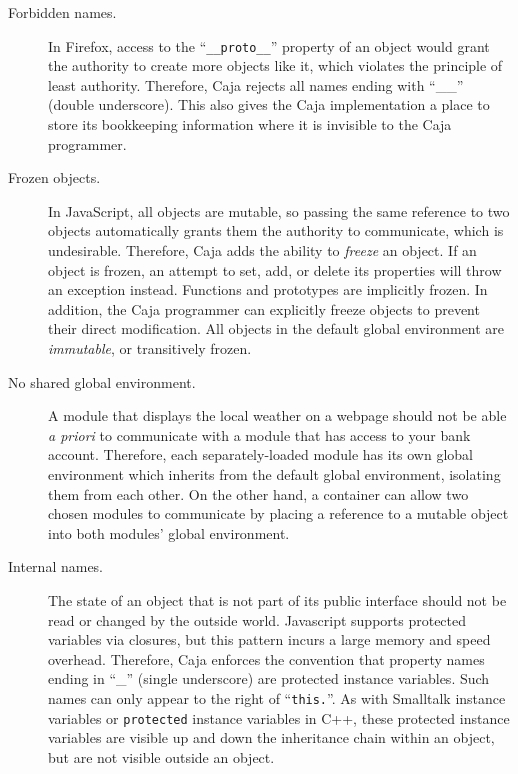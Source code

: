 \documentclass[letterpaper,twocolumn,10pt]{article}
\newcommand{\code}[1]{{\tt {#1}}}              %
\begin{document}
\begin{description}

  \item[Forbidden names.] In Firefox, access to the ``\code{\_\_proto\_\_}'' 
  property of an object would grant the authority to create more objects
  like it, which violates the principle of least authority.  Therefore, 
  Caja rejects all names ending with ``\_\_'' (double 
  underscore). This also gives the Caja implementation a place to store its 
  bookkeeping information where it is invisible to the Caja programmer.
 
  \item[Frozen objects.] In JavaScript, all objects are mutable, so passing
  the same reference to two objects automatically grants them the authority
  to communicate, which is undesirable.  
  Therefore, Caja adds the ability to \emph{freeze} an 
  object. If an object is frozen, an attempt to set, add, or 
  delete its properties will throw an exception instead. Functions and 
  prototypes are implicitly frozen. In addition, the Caja programmer can 
  explicitly freeze objects to prevent their direct modification. All objects 
  in the default global environment are \emph{immutable}, or transitively 
  frozen.
  
  \item[No shared global environment.] A module that displays the local 
  weather on a webpage should not be able \emph{a priori} to communicate 
  with a module that has access to your bank account. Therefore, each 
  separately-loaded module has its own global environment which inherits 
  from the default global environment, isolating them from each other.
  On the other hand, a container can allow two chosen modules to communicate
  by placing a reference to a mutable object into both modules' global
  environment.  

  \item[Internal names.] The state of an object that is not part of its 
  public interface should not be read or changed by the outside world.  
  Javascript supports protected variables via closures, but this pattern 
  incurs a large memory and speed overhead.  Therefore, Caja enforces the
  convention that property names ending in ``\_'' (single underscore) 
  are protected instance variables.  Such names can only appear to the 
  right of ``\code{this.}''. As with Smalltalk instance variables or 
  \code{protected} instance variables in C++, these protected instance 
  variables are visible up and down the inheritance chain within an object, 
  but are not visible outside an object.


\end{description}
\end{document}

